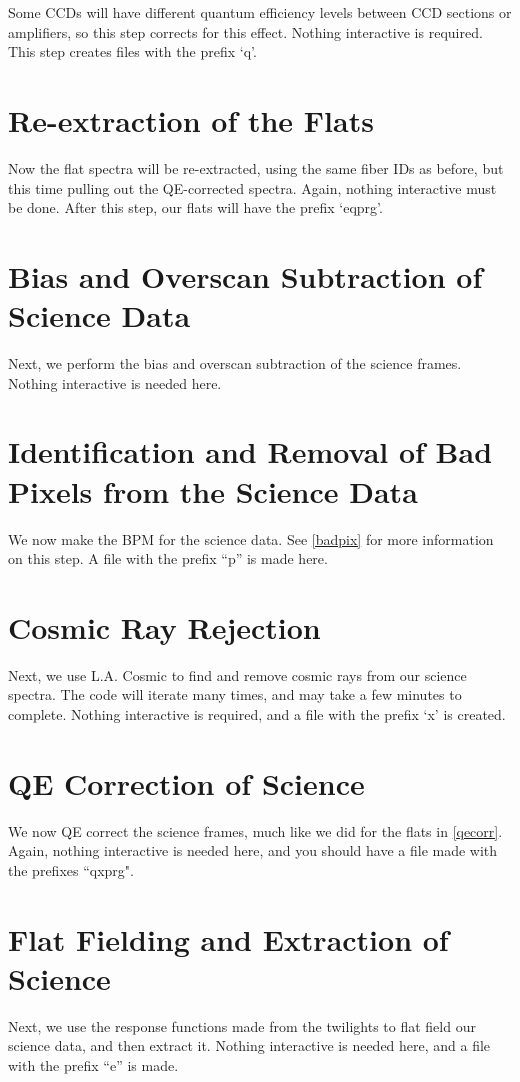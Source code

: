 \documentclass[12pt]{report}
\begin{document}
Some CCDs will have different quantum efficiency levels between CCD sections or amplifiers, so this step corrects for this effect. Nothing interactive is required. This step creates files with the prefix `q'.

\section{Re-extraction of the Flats}

Now the flat spectra will be re-extracted, using the same fiber IDs as before, but this time pulling out the QE-corrected spectra. Again, nothing interactive must be done. After this step, our flats will have the prefix `eqprg'.

\section{Bias and Overscan Subtraction of Science Data}

Next, we perform the bias and overscan subtraction of the science frames. Nothing interactive is needed here.

\section{Identification and Removal of Bad Pixels from the Science Data}
We now make the BPM for the science data. See \autoref{badpix} for more information on this step. A file with the prefix ``p'' is made here.

\section{Cosmic Ray Rejection}

Next, we use L.A. Cosmic to find and remove cosmic rays from our science spectra. The code will iterate many times, and may take a few minutes to complete. Nothing interactive is required, and a file with the prefix `x' is created.

\section{QE Correction of Science}

We now QE correct the science frames, much like we did for the flats in \autoref{qecorr}. Again, nothing interactive is needed here, and you should have a file made with the prefixes ``qxprg".

\section{Flat Fielding and Extraction of Science}
Next, we use the response functions made from the twilights to flat field our science data, and then extract it. Nothing interactive is needed here, and a file with the prefix ``e'' is made.
\end{document}
